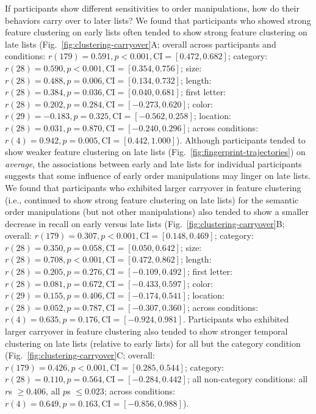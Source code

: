 \documentclass[11pt]{article}
\begin{document}
If participants show different sensitivities to order manipulations, how do
their behaviors carry over to later lists? We found that participants who
showed strong feature clustering on early lists often tended to show strong
feature clustering on late lists (Fig.~\ref{fig:clustering-carryover}A; overall
across participants and conditions: $r(179) = 0.591, p < 0.001, \mathrm{CI} =
[0.472, 0.682]$; category: $r(28) = 0.590, p < 0.001, \mathrm{CI} = [0.354,
0.756]$; size: $r(28) = 0.488, p = 0.006, \mathrm{CI} = [0.134, 0.732]$;
length: $r(28) = 0.384, p = 0.036, \mathrm{CI} = [0.040, 0.681]$; first letter:
$r(28) = 0.202, p = 0.284, \mathrm{CI} = [-0.273, 0.620]$; color: $r(29) =
-0.183, p = 0.325, \mathrm{CI} = [-0.562, 0.258]$; location: $r(28) = 0.031, p
= 0.870, \mathrm{CI} = [-0.240, 0.296]$; across conditions: $r(4) = 0.942, p =
0.005, \mathrm{CI} = [0.442, 1.000]$). Although participants tended to show
weaker feature clustering on late lists
(Fig.~\ref{fig:fingerprint-trajectories}) on \textit{average}, the associations
between early and late lists for individual participants suggests that some
influence of early order manipulations may linger on late lists. We found that
participants who exhibited larger carryover in feature clustering (i.e.,
continued to show strong feature clustering on late lists) for the semantic
order manipulations (but not other manipulations) also tended to show a smaller
decrease in recall on early versus late lists
(Fig.~\ref{fig:clustering-carryover}B; overall: $r(179) = 0.307, p < 0.001,
\mathrm{CI} = [0.148, 0.469]$; category: $r(28) = 0.350, p = 0.058, \mathrm{CI}
= [0.050, 0.642]$; size: $r(28) = 0.708, p < 0.001, \mathrm{CI} = [0.472,
0.862]$; length: $r(28) = 0.205, p = 0.276, \mathrm{CI} = [-0.109, 0.492]$;
first letter: $r(28) = 0.081, p = 0.672, \mathrm{CI} = [-0.433, 0.597]$; color:
$r(29) = 0.155, p = 0.406, \mathrm{CI} = [-0.174, 0.541]$; location: $r(28) =
0.052, p = 0.787, \mathrm{CI} = [-0.307, 0.360]$; across conditions: $r(4) =
0.635, p = 0.176, \mathrm{CI} = [-0.924, 0.981]$. Participants who exhibited
larger carryover in feature clustering also tended to show stronger temporal
clustering on late lists (relative to early lists) for all but the category
condition (Fig.~\ref{fig:clustering-carryover}C; overall: $r(179) = 0.426, p <
0.001, \mathrm{CI} = [0.285, 0.544]$; category: $r(28) = 0.110, p = 0.564,
\mathrm{CI} = [-0.284, 0.442]$; all non-category conditions: all $r$s $\geq
0.406$, all $p$s $\leq 0.023$; across conditions: $r(4) = 0.649, p = 0.163,
\mathrm{CI} = [-0.856, 0.988]$).
\end{document}
